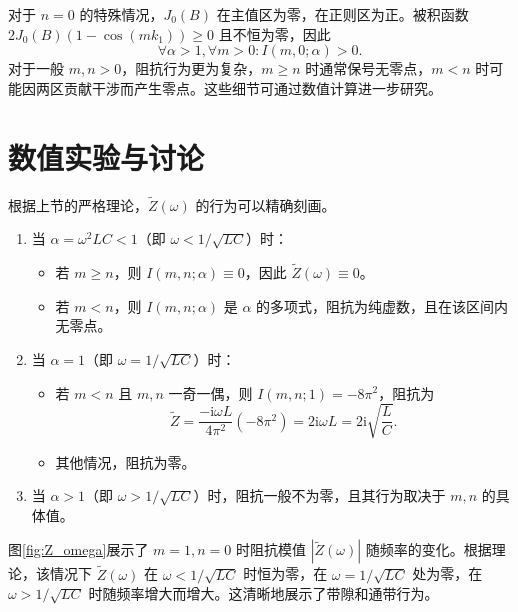 \documentclass{article} %
\newcommand{\ii}{\mathrm{i}}
\begin{document}
对于 $n=0$ 的特殊情况，$J_0(B)$ 在主值区为零，在正则区为正。被积函数 $2J_0(B)(1-\cos(mk_1)) \ge 0$ 且不恒为零，因此
\begin{equation}
    \forall \alpha > 1, \forall m > 0: I(m,0;\alpha) > 0.
    \label{eq:theorem_alpha_greater_1_n0}
\end{equation}
对于一般 $m,n > 0$，阻抗行为更为复杂，$m\ge n$ 时通常保号无零点，$m<n$ 时可能因两区贡献干涉而产生零点。这些细节可通过数值计算进一步研究。

\section{数值实验与讨论}

根据上节的严格理论，$\tilde Z(\omega)$ 的行为可以精确刻画。

\begin{enumerate}
    \item 当 $\alpha = \omega^2 LC < 1$（即 $\omega < 1/\sqrt{LC}$）时：
    \begin{itemize}
        \item 若 $m \ge n$，则 $I(m,n;\alpha) \equiv 0$，因此 $\tilde Z(\omega) \equiv 0$。
        \item 若 $m < n$，则 $I(m,n;\alpha)$ 是 $\alpha$ 的多项式，阻抗为纯虚数，且在该区间内无零点。
    \end{itemize}
    
    \item 当 $\alpha = 1$（即 $\omega = 1/\sqrt{LC}$）时：
    \begin{itemize}
        \item 若 $m < n$ 且 $m,n$ 一奇一偶，则 $I(m,n;1) = -8\pi^2$，阻抗为
        \begin{equation}
            \tilde Z = \frac{-\ii\omega L}{4\pi^2}(-8\pi^2) = 2\ii\omega L = 2\ii\sqrt{\frac{L}{C}}.
        \end{equation}
        \item 其他情况，阻抗为零。
    \end{itemize}
    
    \item 当 $\alpha > 1$（即 $\omega > 1/\sqrt{LC}$）时，阻抗一般不为零，且其行为取决于 $m,n$ 的具体值。
\end{enumerate}

图\ref{fig:Z_omega}展示了 $m=1,n=0$ 时阻抗模值 $|\tilde Z(\omega)|$ 随频率的变化。根据理论，该情况下 $\tilde Z(\omega)$ 在 $\omega < 1/\sqrt{LC}$ 时恒为零，在 $\omega = 1/\sqrt{LC}$ 处为零，在 $\omega > 1/\sqrt{LC}$ 时随频率增大而增大。这清晰地展示了带隙和通带行为。
\end{document}
